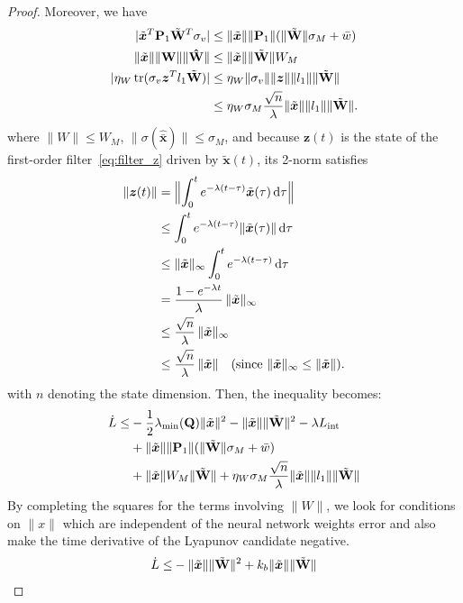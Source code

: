 \documentclass[10pt,twocolumn]{ICCAS}
\newcommand{\tr}{\operatorname{tr}}
\newcommand{\xtilde}{\tilde{\bm{x}}}
\newcommand{\xhatbar}{\hat{\bar{\bm{x}}}}
\newcommand{\Wtilde}{\tilde{\mathbf{W}}}
\newcommand{\What}{\hat{\mathbf{W}}}
\begin{document}
\begin{proof}
Moreover, we have
\begin{align*}
    |\xtilde^T\mathbf{P}_1 \Wtilde^T \sigma_v| &\le \|\xtilde\|\|\mathbf{P}_1\|(\|\Wtilde\| \sigma_{M} + \bar{w})\\
    \|\xtilde\| \|\bf{W}\|\|\What\| &\le \|\xtilde\|\|\Wtilde\| W_M \\
        |\eta_W \tr(\sigma_v \bm{z}^T l_1 \Wtilde)|
    &\le \eta_W \|\sigma_v\| \|\bm{z}\| \|l_1\| \|\Wtilde\| \\
    &\le \eta_W \sigma_M \frac{\sqrt{n}}{\lambda} \|\xtilde\| \|l_1\| \|\Wtilde\|.
\end{align*}
where $\|W\|\le W_M$, $\|\sigma(\xhatbar)\|\le \sigma_M$, and
because $\bm z(t)$ is the state of the first-order filter~\eqref{eq:filter_z}
driven by $\xtilde(t)$, its 2-norm satisfies
\begin{align}
    \|\bm z(t)\|
    &= \Bigl\| \int_{0}^{t} e^{-\lambda(t-\tau)} \xtilde(\tau)\,\mathrm d\tau \Bigr\| \notag\\
    &\le \int_{0}^{t} e^{-\lambda(t-\tau)} \|\xtilde(\tau)\|\,\mathrm d\tau \notag\\
    &\le \|\xtilde\|_{\infty} \int_{0}^{t} e^{-\lambda(t-\tau)}\,\mathrm d\tau \notag\\
    &= \frac{1-e^{-\lambda t}}{\lambda}\,\|\xtilde\|_{\infty} \notag\\
    &\le \frac{\sqrt{n}}{\lambda}\,\|\xtilde\|_{\infty} \notag\\
    &\le \frac{\sqrt{n}}{\lambda}\,\|\xtilde\| \quad (\text{since } \|\xtilde\|_{\infty}\le\|\xtilde\|).
\end{align}
with $n$ denoting the state dimension. Then, the inequality becomes:
\begin{align*}
    \dot{L} \le 
    & -\frac{1}{2}\lambda_{\min}(\mathbf{Q})\|\xtilde\|^2 - \|\xtilde\|\|\Wtilde\|^2 - \lambda L_{\text{int}} \notag \\
    &+ \|\xtilde\|\|\mathbf{P}_1\|(\|\Wtilde\| \sigma_{M} + \bar{w}) \\
    &+ \|\xtilde\| W_M \|\Wtilde\| 
    + \eta_W \sigma_M \frac{\sqrt{n}}{\lambda}\|\xtilde\| \|l_1\| \|\Wtilde\|
    \label{eq:Ldot_ineq_full}
\end{align*}
By completing the squares for the terms involving $\|\hat{W}\|$, we look for conditions on $\|x\|$ which are independent of the neural network weights error and also make the time derivative of the Lyapunov candidate negative.
\begin{align*}
    \dot{L} \le & - \|\xtilde\| \|\Wtilde\|^2 + k_b\|\xtilde\| \|\Wtilde\| \notag \\

\end{align*}
\end{proof}
\end{document}
